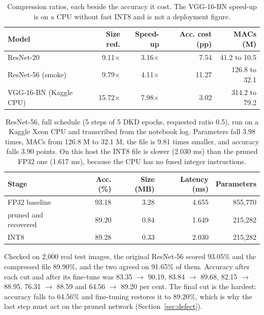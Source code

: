\documentclass[oneside,a4paper,12pt]{report}
\begin{document}
\begin{table}[!htbp]
\centering
\small
\setlength{\tabcolsep}{4pt}
\begin{tabular}{@{}l r r r r@{}}
\toprule
Model & Size red. & Speed-up & Acc. cost (pp) & MACs (M)\\
\midrule
ResNet-20 & 9.11$\times$ & 3.16$\times$ & 7.54 & 41.2 to 10.5\\
ResNet-56 (smoke) & 9.79$\times$ & 4.11$\times$ & 11.27 & 126.8 to 32.1\\
VGG-16-BN (Kaggle CPU) & 15.72$\times$ & 7.98$\times$ & 3.02 & 314.2 to 79.2\\
\bottomrule
\end{tabular}
\caption[Compression ratios beside their accuracy cost.]{Compression ratios, each beside the accuracy it cost. The VGG-16-BN speed-up is on a CPU without fast INT8 and is not a deployment figure.}
\label{tab:ratios}
\end{table}

\begin{table}[!htbp]
\centering
\small
\begin{tabular}{@{}l r r r r@{}}
\toprule
Stage & Acc. (\%) & Size (MB) & Latency (ms) & Parameters\\
\midrule
FP32 baseline & 93.18 & 3.28 & 4.655 & 855,770\\
pruned and recovered & 89.20 & 0.84 & 1.649 & 215,282\\
INT8 & 89.28 & 0.33 & 2.030 & 215,282\\
\bottomrule
\end{tabular}
\caption[ResNet-56, full schedule, Kaggle CPU (transcribed).]{ResNet-56, full schedule (5 steps of 5 DKD epochs, requested ratio 0.5), run on a Kaggle Xeon CPU and transcribed from the notebook log. Parameters fall 3.98 times, MACs from 126.8 M to 32.1 M, the file is 9.81 times smaller, and accuracy falls 3.90 points. On this host the INT8 file is slower (2.030 ms) than the pruned FP32 one (1.617 ms), because the CPU has no fused integer instructions.}
\label{tab:r56full}
\end{table}

Checked on 2,000 real test images, the original ResNet-56 scored 93.05\% and the compressed file 89.90\%, and the two agreed on 91.65\% of them. Accuracy after each cut and after its fine-tune was 83.35 $\to$ 90.19, 83.84 $\to$ 89.68, 82.15 $\to$ 88.95, 76.31 $\to$ 88.59 and 64.56 $\to$ 89.20 per cent. The final cut is the hardest: accuracy falls to 64.56\% and fine-tuning restores it to 89.20\%, which is why the last step must act on the pruned network (Section~\ref{sec:defect}).
\end{document}

